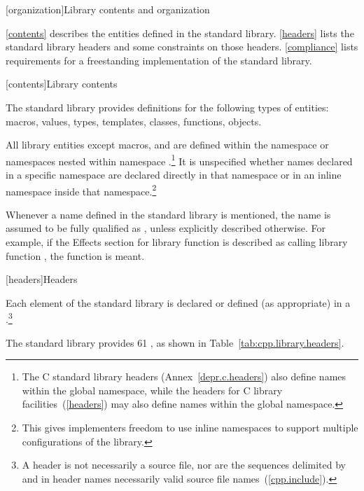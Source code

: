 [organization]{Library contents and organization}

\pnum
\ref{contents} describes the entities defined in the \Cpp standard library.
\ref{headers} lists the standard library headers and some constraints on those headers.
\ref{compliance} lists requirements for a freestanding implementation of the \Cpp
standard library.

[contents]{Library contents}

\pnum
The \Cpp standard library provides definitions for the following types of entities:
macros, values, types, templates, classes, functions, objects.

\pnum
All library entities except macros,
and
are defined within the namespace
or namespaces nested within namespace
.\footnote{The C standard library headers (Annex~\ref{depr.c.headers}) also define
names within the global namespace, while the \Cpp headers for C library
facilities~(\ref{headers}) may also define names within the global namespace.}%
It is unspecified whether names declared in a specific namespace are declared
directly in that namespace or in an inline namespace inside that
namespace.\footnote{This gives implementers freedom to use inline namespaces to
support multiple configurations of the library.}

\pnum
Whenever a name  defined in the standard library is mentioned,
the name  is assumed to be fully qualified as
,
unless explicitly described otherwise. For example, if the Effects section
for library function  is described as calling library function ,
the function
is meant.

[headers]{Headers}

\pnum
Each element of the \Cpp standard library is declared or defined (as appropriate) in a
.\footnote{ A header is not necessarily a source file, nor are the
sequences delimited by \tcode{<} and \tcode{>} in header names necessarily valid source
file names~(\ref{cpp.include}). }

\pnum
The \Cpp standard library provides
61
,
%
as shown in Table~\ref{tab:cpp.library.headers}.

